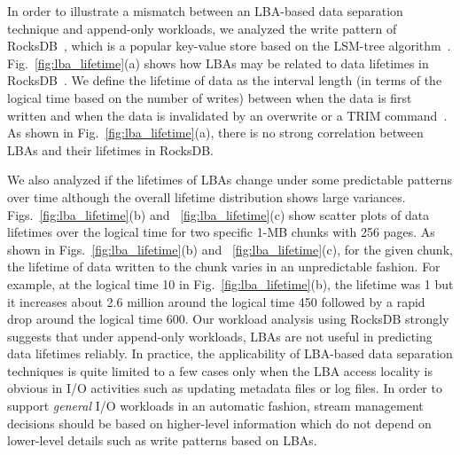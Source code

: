 In order to illustrate a mismatch between an LBA-based data separation technique and 
append-only workloads, we analyzed the write pattern of 
RocksDB~\cite{RocksDB}, which is a
popular key-value store based on the LSM-tree algorithm~\cite{LSM}.
Fig.~\ref{fig:lba_lifetime}(a) shows how LBAs may be related 
to data lifetimes in RocksDB~\cite{RocksDB}.  
We define the lifetime of data as the interval length (in terms of
the logical time based on the number of writes) between
when the data is first written and when the data is invalidated
by an overwrite or a TRIM command~\cite{TRIM}.
As shown in Fig.~\ref{fig:lba_lifetime}(a), 
there is no strong correlation between LBAs and their lifetimes in RocksDB.  

We also analyzed 
if the lifetimes of LBAs change under some predictable patterns over time 
although the overall lifetime distribution shows large variances.
Figs.~\ref{fig:lba_lifetime}(b) and ~\ref{fig:lba_lifetime}(c) show
scatter plots of data lifetimes over the logical time 
for two specific 1-MB chunks with 256 pages. 
As shown in Figs.~\ref{fig:lba_lifetime}(b) and ~\ref{fig:lba_lifetime}(c), 
for the given chunk, the lifetime of data written to the chunk 
varies in an unpredictable fashion.  
For example, at the logical time 10 in Fig.~\ref{fig:lba_lifetime}(b), 
the lifetime was 1 but it increases about 
2.6 million around the logical time 450 
followed by a rapid drop around the logical time 600. 
Our workload analysis using RocksDB strongly suggests that under append-only workloads, 
LBAs are not useful in predicting data lifetimes reliably.
In practice, the applicability of LBA-based data separation techniques is quite 
limited to a few cases only when the LBA access
locality is obvious in I/O activities such as updating metadata files or log files.  
In order to support {\it general} I/O workloads in an automatic fashion, stream 
management decisions should be based on higher-level information
which do not depend on lower-level details such as write patterns based on LBAs.

